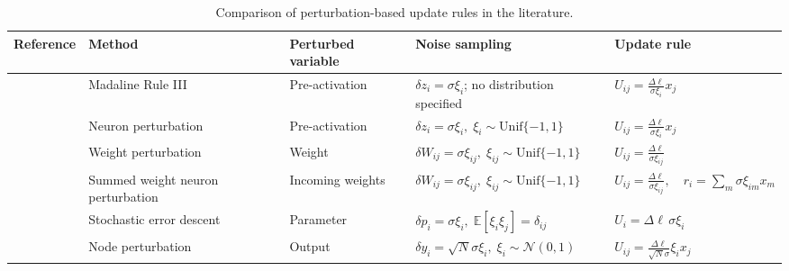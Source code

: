 \begin{table}
\centering
\scriptsize
\caption{Comparison of perturbation-based update rules in the literature.}
\label{tab:perturbation_update_rules}

\begin{tabularx}{\textheight}{
    >{\raggedright\arraybackslash}p{2.3cm}
    >{\raggedright\arraybackslash}p{3.0cm}
    >{\raggedright\arraybackslash}p{2.0cm}
    >{\centering\arraybackslash}p{4.7cm}
    >{\raggedright\arraybackslash}X
}
\toprule
\textbf{Reference} &
\textbf{Method} &
\textbf{Perturbed variable} &
\textbf{Noise sampling} &
\textbf{Update rule} \\
\midrule

\textcite{widrow_30_1990}
& Madaline Rule III
& Pre-activation
& \(\delta z_i=\sigma\xi_i\);
no distribution specified
& \(U_{ij} =
\frac{\Delta \ell}{\sigma\xi_i}
x_j\) \\
\addlinespace
\midrule
\addlinespace

\textcite{flower_summed_1992}
& Neuron perturbation
& Pre-activation
& \(\delta z_i=\sigma\xi_i,\;
\xi_i \sim \mathrm{Unif}\{-1,1\}\)
& \(U_{ij}
=
\frac{\Delta \ell}{\sigma\xi_i}
x_j\) \\

\addlinespace

\textcite{flower_summed_1992}
& Weight perturbation
& Weight
& \(\delta W_{ij}=\sigma\xi_{ij},\;
\xi_{ij} \sim \mathrm{Unif}\{-1,1\}\)
& \(U_{ij}
=
\frac{\Delta \ell}{\sigma\xi_{ij}}\) \\

\addlinespace

\textcite{flower_summed_1992}
& Summed weight neuron perturbation
& Incoming weights
& \(\delta W_{ij}=\sigma\xi_{ij},\;
\xi_{ij} \sim \mathrm{Unif}\{-1,1\}\)
& \(U_{ij}
=
\frac{\Delta \ell}{\sigma\xi_{ij}},
\quad
r_i = \sum_m \sigma\xi_{im}x_m\) \\
\addlinespace
\midrule
\addlinespace

\textcite{cauwenberghs_fast_1992}
& Stochastic error descent
& Parameter
& \(\delta p_i=\sigma\xi_i,\;
\mathbb{E}[\xi_i\xi_j]=\delta_{ij}\)
& \(U_i =
\Delta \ell\,
\sigma\xi_i\) \\
\addlinespace
\midrule
\addlinespace

\textcite{werfel_learning_2003}
& Node perturbation
& Output
& \(\delta y_i
=\sqrt{N}\sigma\xi_i,\;
\xi_i\sim\mathcal{N}(0,1)\)
& \(U_{ij} =
\frac{\Delta \ell}{\sqrt{N}\sigma}
\xi_i x_j\) \\


\end{tabularx}
\end{table}
